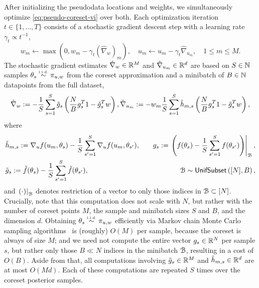 After initializing the pseudodata locations and weights,
we simultaneously optimize \cref{eq:pseudo-coreset-vi} over both.
Each optimization iteration $t\in \{1, \dots, T\}$ consists of a stochastic gradient descent step
with a learning rate $\gamma_t \propto t^{-1}$,  
\[
w_m \gets \max\left(0, w_m - \gamma_t (\hat\nabla_{w})_m\right),
\quad u_m \gets u_{m} - \gamma_t \hat\nabla_{u_{m}},
\quad 1\leq m \leq M.
\label{eq:gd-update}
\]
The stochastic gradient estimates $\hat\nabla_w \in \mathbb{R}^M$ and $\hat\nabla_{u_m} \in \mathbb{R}^d$
are based on $S\in\mathbb{N}$ samples $\theta_s \distiid \pi_{u,w}$ from the coreset approximation
and a minibatch of $B\in\mathbb{N}$ datapoints from the full dataset,
\[
\hat\nabla_w := -\frac{1}{S}\sum_{s=1}^{S} \tilde{g}_s \left(\frac{N}{B}g_s^T 1  -  \tilde{g}_s^Tw  \right) \label{eq:weight-optimization-mc}, \quad \\
\hat\nabla_{u_m} := - w_m \frac{1}{S}\sum_{s=1}^{S} \tilde{h}_{m,s}  \left(\frac{N}{B}g_s^T 1 - \tilde{g}_s^T w \right), \label{eq:location-optimization-mc-cov}
\]
where
\[
\begin{aligned}
& \tilde{h}_{m,s} :=\nabla_u f(u_m, \theta_s) - \frac{1}{S} \sum_{s'=1}^{S}\nabla_u f(u_m, \theta_{s'}),
\quad & g_s := \left. \left(f(\theta_s) - \frac{1}{S} \sum_{s'=1}^{S} f(\theta_{s'})\right)\right|_{\mathcal{B}},\\
& \tilde{g}_s := \tilde{f}(\theta_s) - \frac{1}{S} \sum_{s'=1}^{S} \tilde{f}(\theta_{s'}),
\quad & \mathcal{B} \sim {\sf{UnifSubset}}\left([N], B\right),
\end{aligned}\label{eq:gradparts}
\] 
and $\left.(\cdot)\right|_{\mathcal{B}}$ denotes restriction of a vector to only those indices in $\mathcal{B}\subset[N]$.
Crucially, note that this computation does not scale with $N$, but rather with the number
of coreset points $M$, the sample and minibatch sizes $S$ and $B$, and the dimension $d$.
Obtaining $\theta_s\distiid \pi_{u,w}$ efficiently via Markov chain Monte Carlo sampling
algorithms~\citep{hoffman14,jacob17} is (roughly) $O(M)$ per sample, because the coreset is always of size $M$;
and we need not compute
the entire vector $g_s\in\mathbb{R}^N$ per sample $s$, but rather only those $B\ll N$ indices in the minibatch $\mathcal{B}$,
resulting in a cost of $O(B)$.
Aside from that, all computations involving $\tilde{g}_s\in\mathbb{R}^M$ and $\tilde{h}_{m,s}\in\mathbb{R}^d$ are at most $O(Md)$.
Each of these computations are repeated $S$ times over the coreset posterior samples.





